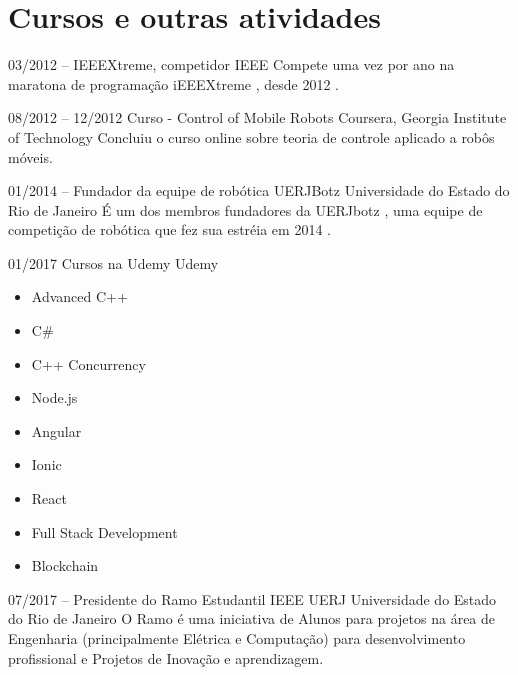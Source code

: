 \documentclass[]{friggeri-cv} %
\begin{document}

\section{Cursos e outras atividades}

\begin{entrylist}



\entry
{03/2012 -- }
{\hspace{.15cm}IEEEXtreme, competidor}
{IEEE}
{Compete uma vez por ano na maratona de programação iEEEXtreme , desde 2012 .}

\entry
{08/2012 -- 12/2012}
{\hspace{.15cm}Curso - Control of Mobile Robots}
{Coursera, Georgia Institute of Technology}
{Concluiu o curso online sobre teoria de controle aplicado a robôs móveis.}

\entry
{01/2014 -- }
{\hspace{.15cm}Fundador da equipe de robótica UERJBotz}
{Universidade do Estado do Rio de Janeiro}
{É um dos membros fundadores da UERJbotz , uma equipe de competição de robótica que fez sua estréia em 2014 .}

\entry
{01/2017}
{\hspace{.15cm}Cursos na Udemy}
{Udemy}
{\begin{itemize}
\item Advanced C++
\item C#
\item C++ Concurrency
\item Node.js
\item Angular
\item Ionic
\item React
\item Full Stack Development
\item Blockchain
\end{itemize}}

\entry
{07/2017 -- }
{\hspace{.15cm} Presidente do Ramo Estudantil IEEE UERJ}
{Universidade do Estado do Rio de Janeiro}
{O Ramo é uma iniciativa de Alunos para projetos na área de Engenharia (principalmente Elétrica e Computação) para desenvolvimento profissional e Projetos de Inovação e aprendizagem.}


\end{entrylist}
\end{document}
